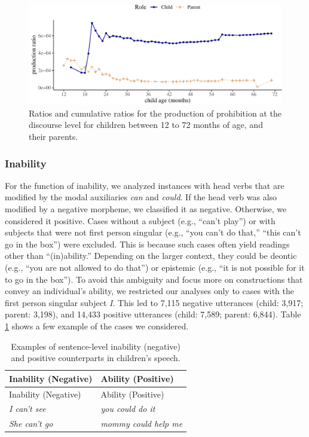 \documentclass[
  english,
  man,floatsintext]{apa6}
\begin{document}
\begin{figure}[H]

{\centering \includegraphics{neg_construction_article_files/figure-latex/prohibitiondiscourse-1} 

}

\caption{Ratios and cumulative ratios for the production of prohibition at the discourse level for children between 12 to 72 months of age, and their parents.}\label{fig:prohibitiondiscourse}
\end{figure}

\hypertarget{inability}{%
\subsubsection{Inability}\label{inability}}

For the function of inability, we analyzed instances with head verbs that are modified by the modal auxiliaries \emph{can} and \emph{could}. If the head verb was also modified by a negative morpheme, we classified it as negative. Otherwise, we considered it positive. Cases without a subject (e.g., ``can't play'') or with subjects that were not first person singular (e.g., ``you can't do that,'' ``this can't go in the box'') were excluded. This is because such cases often yield readings other than ``(in)ability.'' Depending on the larger context, they could be deontic (e.g., ``you are not allowed to do that'') or epistemic (e.g., ``it is not possible for it to go in the box''). To avoid this ambiguity and focus more on constructions that convey an individual's ability, we restricted our analyses only to cases with the first person singular subject \emph{I}. This led to 7,115 negative utterances (child: 3,917; parent: 3,198), and 14,433 positive utterances (child: 7,589; parent: 6,844). Table \ref{tab:inab} shows a few example of the cases we considered.

\begin{longtable}[]{@{}ll@{}}
\caption{\label{tab:inab} Examples of sentence-level inability (negative) and positive counterparts in children's speech.}\tabularnewline
\toprule
Inability (Negative) & Ability (Positive) \\
\midrule
\endfirsthead
\toprule
Inability (Negative) & Ability (Positive) \\
\midrule
\endhead
\emph{I can't see} & \emph{you could do it} \\
\emph{She can't go} & \emph{mommy could help me} \\
\bottomrule
\end{longtable}
\end{document}
